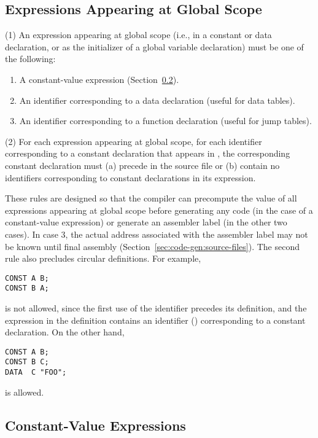 \documentclass[10pt]{article}
\begin{document}
\subsection{Expressions Appearing at Global Scope}
\label{sec:semantic:global-expr}

(1) An expression appearing at global scope (i.e., in a constant or
data declaration, or as the initializer of a global variable
declaration) must be one of the following:
%
\begin{enumerate}
%
\item A constant-value expression
  (Section~\ref{sec:semantics:constant-value-expr}).
%
\item An identifier corresponding to a data declaration (useful for
  data tables).
%
\item An identifier corresponding to a function declaration (useful
  for jump tables).
%
\end{enumerate}

(2) For each expression  appearing at global scope, for
each identifier corresponding to a constant declaration that appears
in , the corresponding constant declaration must (a)
precede  in the source file or (b) contain no
identifiers corresponding to constant declarations in its expression.

These rules are designed so that the compiler can precompute the value
of all expressions appearing at global scope before generating any
code (in the case of a constant-value expression) or generate an
assembler label (in the other two cases).  In case 3, the actual
address associated with the assembler label may not be known until
final assembly (Section~\ref{sec:code-gen:source-files}).  The second
rule also precludes circular definitions.  For example,
%
\begin{verbatim}
CONST A B;
CONST B A;
\end{verbatim}
%
is not allowed, since the first use of the identifier  precedes
its definition, and the expression in the definition contains an
identifier () corresponding to a constant declaration.  On the
other hand,
%
\begin{verbatim}
CONST A B;
CONST B C;
DATA  C "FOO";
\end{verbatim}
%
is allowed.


\subsection{Constant-Value Expressions}
\label{sec:semantics:constant-value-expr}
\end{document}
